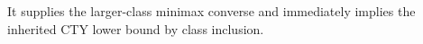 It supplies the larger-class minimax converse and immediately implies the inherited CTY lower bound by class inclusion.